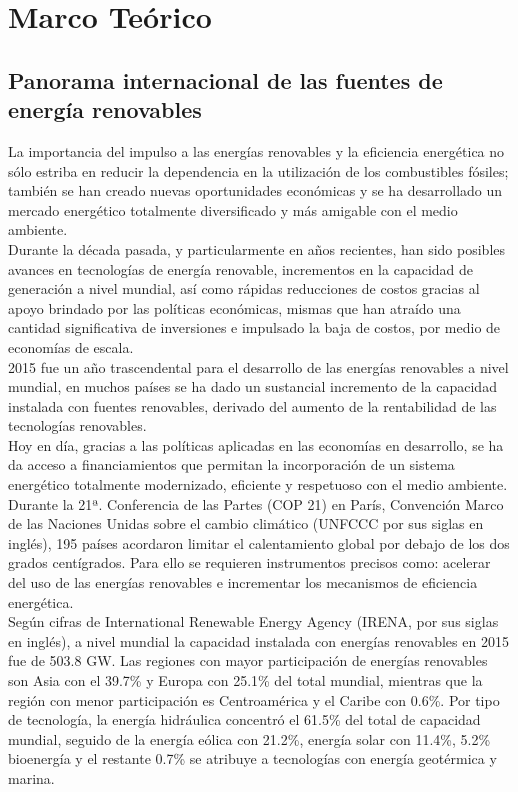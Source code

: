 \chapter{Marco Teórico}

\section{Panorama internacional de las fuentes de energía renovables}
La importancia del impulso a las energías renovables y la eficiencia energética no sólo estriba en reducir la dependencia en la utilización de los combustibles fósiles; también se han creado nuevas oportunidades económicas y se ha desarrollado un mercado energético totalmente diversificado y más amigable con el medio ambiente.\\

Durante la década pasada, y particularmente en años recientes, han sido posibles avances en tecnologías de energía renovable, incrementos en la capacidad de generación a nivel mundial, así como rápidas reducciones de costos gracias al apoyo brindado por las políticas económicas, mismas que han atraído una cantidad significativa de inversiones e impulsado la baja de costos, por medio de economías de escala.\\

2015 fue un año trascendental para el desarrollo de las energías renovables a nivel mundial, en muchos países se ha dado un sustancial incremento de la capacidad instalada con fuentes renovables, derivado del aumento de la rentabilidad de las tecnologías renovables.\\

Hoy en día, gracias a las políticas aplicadas en las economías en desarrollo, se ha da acceso a financiamientos que permitan la incorporación de un sistema energético totalmente modernizado, eficiente y respetuoso con el medio ambiente. Durante la 21ª. Conferencia de las Partes (COP 21) en París, Convención Marco de las Naciones Unidas sobre el cambio climático (UNFCCC por sus siglas en inglés), 195 países acordaron limitar el calentamiento global por debajo de los dos grados centígrados. Para ello se requieren instrumentos precisos como: acelerar del uso de las energías renovables e incrementar los mecanismos de eficiencia energética.\\

Según cifras de International Renewable Energy Agency (IRENA, por sus siglas en inglés), a nivel mundial la capacidad instalada con energías renovables en 2015 fue de 503.8 GW. Las regiones con mayor participación de energías renovables son Asia con el 39.7\% y Europa con 25.1\% del total mundial, mientras que la región con menor participación es Centroamérica y el Caribe con 0.6\%. Por tipo de tecnología, la energía hidráulica concentró el 61.5\% del total de capacidad mundial, seguido de la energía eólica con 21.2\%, energía solar con 11.4\%, 5.2\% bioenergía y el restante 0.7\% se atribuye a tecnologías con energía geotérmica y marina.\\

